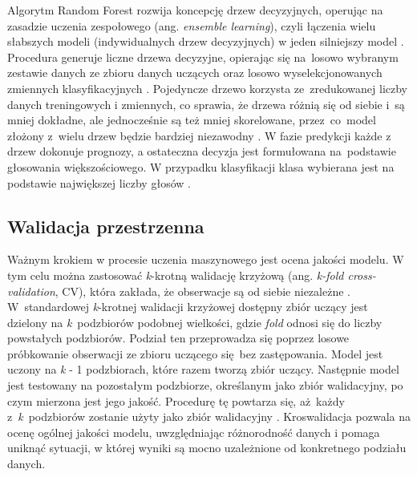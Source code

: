 \documentclass{amuthesis}
\begin{document}
Algorytm Random Forest rozwija koncepcję drzew decyzyjnych, operując na
zasadzie uczenia zespołowego (ang. \emph{ensemble learning}), czyli
łączenia wielu słabszych modeli (indywidualnych drzew decyzyjnych) w
jeden silniejszy model
\autocite{aaron_2018_ml,sekulic_2020_rf_interpolation}. Procedura
generuje liczne drzewa decyzyjne, opierając się na~losowo wybranym
zestawie danych ze zbioru danych uczących oraz losowo wyselekcjonowanych
zmiennych klasyfikacyjnych \autocite{breiman_2001_rf}. Pojedyncze drzewo
korzysta ze~zredukowanej liczby danych treningowych i zmiennych, co
sprawia, że drzewa różnią się od siebie i~są mniej dokładne, ale
jednocześnie są też mniej skorelowane, przez~co~model złożony z~wielu
drzew będzie bardziej niezawodny
\autocite{sekulic_2020_rf_interpolation}. W fazie predykcji każde z
drzew dokonuje prognozy, a ostateczna decyzja jest formułowana
na~podstawie głosowania większościowego. W przypadku klasyfikacji klasa
wybierana jest na podstawie największej liczby głosów
\autocite{breiman_2001_rf}.

\hypertarget{sec-spcv}{%
\subsection{Walidacja przestrzenna}\label{sec-spcv}}

Ważnym krokiem w procesie uczenia maszynowego jest ocena jakości modelu.
W tym celu można zastosować \emph{k}-krotną walidację krzyżową (ang.
\emph{k-fold cross-validation}, CV), która zakłada, że obserwacje są od
siebie niezależne \autocite{pohjankukka_2017_scv}. W~standardowej
\emph{k}-krotnej walidacji krzyżowej dostępny zbiór uczący jest dzielony
na \emph{k}~podzbiorów podobnej wielkości, gdzie \emph{fold} odnosi się
do liczby powstałych podzbiorów. Podział ten przeprowadza się poprzez
losowe próbkowanie obserwacji ze zbioru uczącego się~bez zastępowania.
Model jest uczony na \emph{k} - 1 podzbiorach, które razem tworzą zbiór
uczący. Następnie model jest testowany na pozostałym podzbiorze,
określanym jako zbiór walidacyjny, po czym mierzona jest jego jakość.
Procedurę tę powtarza się, aż~każdy z~\emph{k}~podzbiorów zostanie użyty
jako zbiór walidacyjny \autocite{berrar_2018_cv}. Kroswalidacja pozwala
na ocenę ogólnej jakości modelu, uwzględniając różnorodność danych i
pomaga uniknąć sytuacji, w której wyniki są mocno uzależnione od
konkretnego podziału danych.
\end{document}
